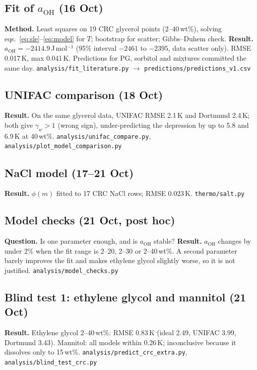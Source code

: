 \documentclass[11pt,a4paper]{article}
\newcommand{\aoh}{a_{\mathrm{OH}}}
\newcommand{\file}[1]{\texttt{\small #1}}
\begin{document}
\subsection{Fit of $\aoh$ (16 Oct)}
\textbf{Method.} Least squares on 19 CRC glycerol points (2--40\,wt\%), solving eqs.~\ref{eq:sle}--\ref{eq:model} for $T$;
bootstrap for scatter; Gibbs--Duhem check.
\textbf{Result.} $\aoh=-2414.9$\,J\,mol$^{-1}$ (95\% interval $-2461$ to $-2395$, data scatter only). RMSE
0.017\,K, max 0.041\,K. Predictions for PG, sorbitol and mixtures committed the same day.
\file{analysis/fit\_literature.py} $\rightarrow$ \file{predictions/predictions\_v1.csv}

\subsection{UNIFAC comparison (18 Oct)}
\textbf{Result.} On the same glycerol data, UNIFAC RMSE 2.1\,K and Dortmund 2.4\,K; both give $\gamma_w>1$ (wrong sign),
under-predicting the depression by up to 5.8 and 6.9\,K at 40\,wt\%. \file{analysis/unifac\_compare.py},
\file{analysis/plot\_model\_comparison.py}

\subsection{NaCl model (17--21 Oct)}
\textbf{Result.} $\phi(m)$ fitted to 17 CRC NaCl rows; RMSE 0.023\,K. \file{thermo/salt.py}

\subsection{Model checks (21 Oct, post hoc)}
\textbf{Question.} Is one parameter enough, and is $\aoh$ stable?
\textbf{Result.} $\aoh$ changes by under 2\% when the fit range is 2--20, 2--30 or 2--40\,wt\%. A second parameter barely
improves the fit and makes ethylene glycol slightly worse, so it is not justified.
\file{analysis/model\_checks.py}

\subsection{Blind test 1: ethylene glycol and mannitol (21 Oct)}
\textbf{Result.} Ethylene glycol 2--40\,wt\%: RMSE 0.83\,K (ideal 2.49, UNIFAC 3.99, Dortmund 3.43). Mannitol: all
models within 0.26\,K; inconclusive because it dissolves only to 15\,wt\%.
\file{analysis/predict\_crc\_extra.py}, \file{analysis/blind\_test\_crc.py}
\end{document}
